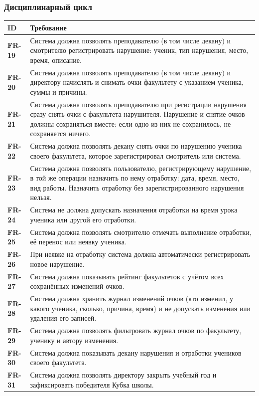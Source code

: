 \documentclass[a4paper,12pt]{article}
\newcommand{\req}[2]{\textbf{#1} & #2 \\ \hline}
\newenvironment{reqtable}{%
  \begin{longtable}{|>{\raggedright\arraybackslash}p{19mm}|>{\raggedright\arraybackslash}p{137mm}|}
  \hline
  \rowcolor{black!8}\textbf{ID} & \textbf{Требование} \\ \hline
  \endhead}{\end{longtable}}
\begin{document}
\subsubsection{Дисциплинарный цикл}
\begin{reqtable}
\req{FR-19}{Система должна позволять преподавателю (в том числе декану) и смотрителю регистрировать нарушение: ученик, тип нарушения, место, время, описание.}
\req{FR-20}{Система должна позволять преподавателю (в том числе декану) и директору начислять и снимать очки факультету с указанием ученика, суммы и причины.}
\req{FR-21}{Система должна позволять преподавателю при регистрации нарушения сразу снять очки с факультета нарушителя. Нарушение и снятие очков должны сохраняться вместе: если одно из них не сохранилось, не сохраняется ничего.}
\req{FR-22}{Система должна позволять декану снять очки по нарушению ученика своего факультета, которое зарегистрировал смотритель или система.}
\req{FR-23}{Система должна позволять пользователю, регистрирующему нарушение, в той же операции назначить по нему отработку: дата, время, место, вид работы. Назначить отработку без зарегистрированного нарушения нельзя.}
\req{FR-24}{Система не должна допускать назначения отработки на время урока ученика или другой его отработки.}
\req{FR-25}{Система должна позволять смотрителю отмечать выполнение отработки, её перенос или неявку ученика.}
\req{FR-26}{При неявке на отработку система должна автоматически регистрировать новое нарушение.}
\req{FR-27}{Система должна показывать рейтинг факультетов с учётом всех сохранённых изменений очков.}
\req{FR-28}{Система должна хранить журнал изменений очков (кто изменил, у какого ученика, сколько, причина, время) и не допускать изменения или удаления его записей.}
\req{FR-29}{Система должна позволять фильтровать журнал очков по факультету, ученику и автору изменения.}
\req{FR-30}{Система должна показывать декану нарушения и отработки учеников своего факультета.}
\req{FR-31}{Система должна позволять директору закрыть учебный год и зафиксировать победителя Кубка школы.}
\end{reqtable}
 
\end{document}

